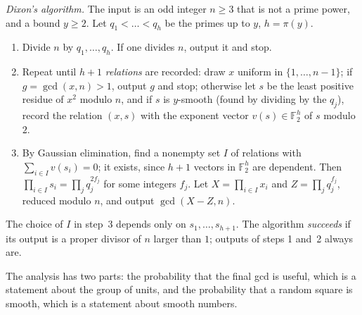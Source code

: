 \emph{Dixon's algorithm.} The input is an odd integer $n\ge3$ that is not a prime power, and a bound $y\ge2$. Let $q_1<\dots<q_h$ be the primes up to $y$, $h=\pi(y)$.
\begin{enumerate}
\item Divide $n$ by $q_1,\dots,q_h$. If one divides $n$, output it and stop.
\item Repeat until $h+1$ \emph{relations} are recorded: draw $x$ uniform in $\{1,\dots,n-1\}$; if $g=\gcd(x,n)>1$, output $g$ and stop; otherwise let $s$ be the least positive residue of $x^2$ modulo $n$, and if $s$ is $y$-smooth (found by dividing by the $q_j$), record the relation $(x,s)$ with the exponent vector $v(s)\in\mathbb F_2^h$ of $s$ modulo $2$.
\item By Gaussian elimination, find a nonempty set $I$ of relations with $\sum_{i\in I}v(s_i)=0$; it exists, since $h+1$ vectors in $\mathbb F_2^h$ are dependent. Then $\prod_{i\in I}s_i=\prod_jq_j^{2f_j}$ for some integers $f_j$. Let $X=\prod_{i\in I}x_i$ and $Z=\prod_jq_j^{f_j}$, reduced modulo $n$, and output $\gcd(X-Z,n)$.
\end{enumerate}
The choice of $I$ in step~3 depends only on $s_1,\dots,s_{h+1}$. The algorithm \emph{succeeds} if its output is a proper divisor of $n$ larger than $1$; outputs of steps 1 and~2 always are.

The analysis has two parts: the probability that the final gcd is useful, which is a statement about the group of units, and the probability that a random square is smooth, which is a statement about smooth numbers.

